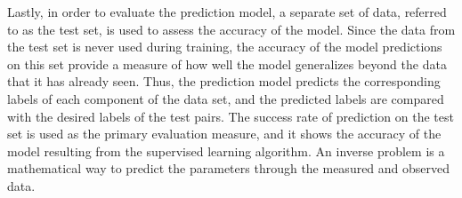  Lastly, in order to evaluate the prediction model, a separate set of data, referred to as the test set, is used to assess the accuracy of the model.
{}
{}
Since the data from the test set is never used during training, the accuracy of the model predictions on this set provide a measure of how well the model generalizes beyond the data that it has already seen.
 Thus, the prediction model predicts the corresponding labels of each component of the data set, and the predicted labels are compared with the desired labels of the test pairs.
 The success rate of prediction on the test set is used as the primary evaluation measure, and it shows the accuracy of the model resulting from the supervised learning algorithm.
{}
An inverse problem is a mathematical way to predict the parameters through the measured and observed data.
{}
{}
